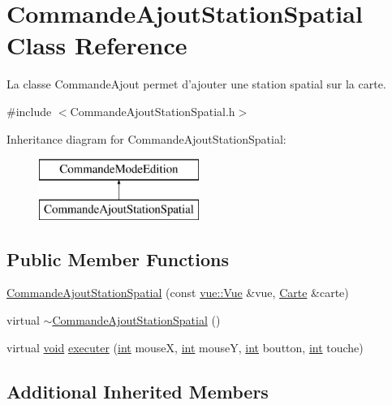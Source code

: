 \hypertarget{class_commande_ajout_station_spatial}{\section{Commande\-Ajout\-Station\-Spatial Class Reference}
\label{class_commande_ajout_station_spatial}
}


La classe Commande\-Ajout permet d'ajouter une station spatial sur la carte.  




{\ttfamily \#include $<$Commande\-Ajout\-Station\-Spatial.\-h$>$}

Inheritance diagram for Commande\-Ajout\-Station\-Spatial\-:\begin{figure}[H]
\begin{center}
\leavevmode
\includegraphics[height=2.000000cm]{class_commande_ajout_station_spatial}
\end{center}
\end{figure}
\subsection*{Public Member Functions}
\begin{DoxyCompactItemize}
\item 
\hyperlink{class_commande_ajout_station_spatial_ac827fa45fba577affd3455adede0c426}{Commande\-Ajout\-Station\-Spatial} (const \hyperlink{classvue_1_1_vue}{vue\-::\-Vue} \&vue, \hyperlink{class_carte}{Carte} \&carte)
\item 
virtual \hyperlink{class_commande_ajout_station_spatial_a41b6a3345606a722dcbec687ab234d9e}{$\sim$\-Commande\-Ajout\-Station\-Spatial} ()
\item 
virtual \hyperlink{wglew_8h_aeea6e3dfae3acf232096f57d2d57f084}{void} \hyperlink{class_commande_ajout_station_spatial_a92ca290ca6ca127e618e3463bf3fe75b}{executer} (\hyperlink{wglew_8h_a500a82aecba06f4550f6849b8099ca21}{int} mouse\-X, \hyperlink{wglew_8h_a500a82aecba06f4550f6849b8099ca21}{int} mouse\-Y, \hyperlink{wglew_8h_a500a82aecba06f4550f6849b8099ca21}{int} boutton, \hyperlink{wglew_8h_a500a82aecba06f4550f6849b8099ca21}{int} touche)
\end{DoxyCompactItemize}
\subsection*{Additional Inherited Members}


